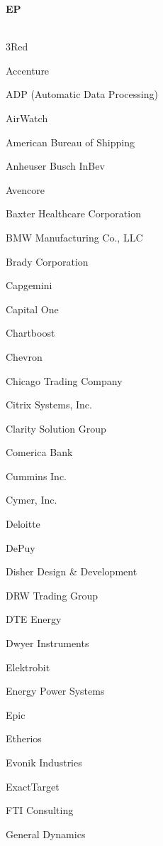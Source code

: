 \documentclass[twoside]{article}
\begin{document}
\begin{center}
\begin{multicols}{5}
\begin{FlushLeft}
\begin{compactitem}
\end{compactitem}
        \end{FlushLeft}
        \vspace{1em}
        {\fontsize{14}{16}\selectfont \bf EP}\\
        \vspace{-1em}
        ~\hrulefill~
        \vspace{-.9em}
        \begin{FlushLeft}
        \begin{compactitem}
        \item 3Red
\item Accenture
\item ADP (Automatic Data Processing)
\item AirWatch
\item American Bureau of Shipping
\item Anheuser Busch InBev
\item Avencore
\item Baxter Healthcare Corporation
\item BMW Manufacturing Co., LLC
\item Brady Corporation
\item Capgemini
\item Capital One
\item Chartboost
\item Chevron
\item Chicago Trading Company
\item Citrix Systems, Inc.
\item Clarity Solution Group
\item Comerica Bank
\item Cummins Inc.
\item Cymer, Inc.
\item Deloitte
\item DePuy
\item Disher Design \& Development
\item DRW Trading Group
\item DTE Energy
\item Dwyer Instruments
\item Elektrobit
\item Energy Power Systems
\item Epic
\item Etherios
\item Evonik Industries
\item ExactTarget
\item FTI Consulting
\item General Dynamics

\end{compactitem}
\end{FlushLeft}
\end{multicols}
\end{center}
\end{document}
